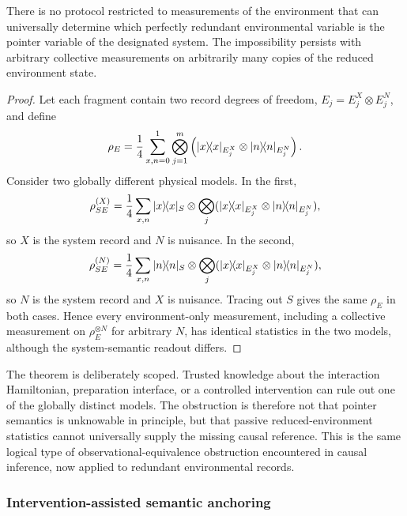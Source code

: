 \begin{theorem}
\label{thm:semantic-nogo}
There is no protocol restricted to measurements of the environment that can universally determine which perfectly redundant environmental variable is the pointer variable of the designated system.  The impossibility persists with arbitrary collective measurements on arbitrarily many copies of the reduced environment state.
\end{theorem}

\begin{proof}
Let each fragment contain two record degrees of freedom, $E_j=E_j^X\otimes E_j^N$, and define
\begin{equation}
\rho_E=\frac14\sum_{x,n=0}^{1}\bigotimes_{j=1}^{m}
\left(|x\rangle\!\langle x|_{E_j^X}\otimes|n\rangle\!\langle n|_{E_j^N}\right).
\label{eq:same-env}
\end{equation}
Consider two globally different physical models.  In the first,
\begin{equation}
\rho^{(X)}_{SE}=\frac14\sum_{x,n}|x\rangle\!\langle x|_S\otimes
\bigotimes_j(|x\rangle\!\langle x|_{E_j^X}\otimes|n\rangle\!\langle n|_{E_j^N}),
\end{equation}
so $X$ is the system record and $N$ is nuisance.  In the second,
\begin{equation}
\rho^{(N)}_{SE}=\frac14\sum_{x,n}|n\rangle\!\langle n|_S\otimes
\bigotimes_j(|x\rangle\!\langle x|_{E_j^X}\otimes|n\rangle\!\langle n|_{E_j^N}),
\end{equation}
so $N$ is the system record and $X$ is nuisance.  Tracing out $S$ gives the same $\rho_E$ in both cases.  Hence every environment-only measurement, including a collective measurement on $\rho_E^{\otimes N}$ for arbitrary $N$, has identical statistics in the two models, although the system-semantic readout differs.\qedhere
\end{proof}

The theorem is deliberately scoped.  Trusted knowledge about the interaction Hamiltonian, preparation interface, or a controlled intervention can rule out one of the globally distinct models.  The obstruction is therefore not that pointer semantics is unknowable in principle, but that passive reduced-environment statistics cannot universally supply the missing causal reference.  This is the same logical type of observational-equivalence obstruction encountered in causal inference, now applied to redundant environmental records.

\subsubsection{Intervention-assisted semantic anchoring}
\label{sec:intervention}

